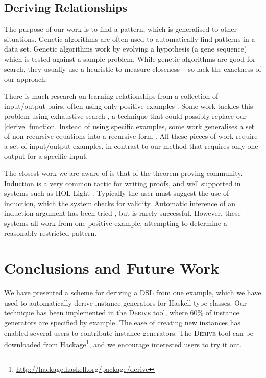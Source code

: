 \documentclass{llncs}
\newcommand{\derive}{\textsc{Derive}}
\begin{document}
\subsection{Deriving Relationships}

The purpose of our work is to find a pattern, which is generalised to other situations. Genetic algorithms \cite{genetic_algorithms} are often used to automatically find patterns in a data set. Genetic algorithms work by evolving a hypothesis (a gene sequence) which is tested against a sample problem. While genetic algorithms are good for search, they usually use a heuristic to measure closeness -- so lack the exactness of our approach.

There is much research on learning relationships from a collection of input/output pairs, often using only positive examples \cite{kitzelmann:data_driven_induction_ground}. Some work tackles this problem using exhaustive search \cite{katayama:exhaustive_generation}, a technique that could possibly replace our |derive| function. Instead of using specific examples, some work generalises a set of non-recursive equations into a recursive form \cite{kitzelmann:inductive_synthesis,kitzelmann:data_driven_induction}. All these pieces of work require a set of input/output examples, in contrast to our method that requires only one output for a specific input.

The closest work we are aware of is that of the theorem proving community. Induction is a very common tactic for writing proofs, and well supported in systems such as HOL Light \cite{hol_light}. Typically the user must suggest the use of induction, which the system checks for validity. Automatic inference of an induction argument has been tried \cite{mintchev:reasoning}, but is rarely successful. However, these systems all work from one positive example, attempting to determine a reasonably restricted pattern.

\section{Conclusions and Future Work}
\label{sec:conclusion}

We have presented a scheme for deriving a DSL from one example, which we have used to automatically derive instance generators for Haskell type classes. Our technique has been implemented in the \derive{} tool, where 60\% of instance generators are specified by example. The ease of creating new instances has enabled several users to contribute instance generators. The \derive{} tool can be downloaded from Hackage\footnote{\url{http://hackage.haskell.org/package/derive}}, and we encourage interested users to try it out.
\end{document}
